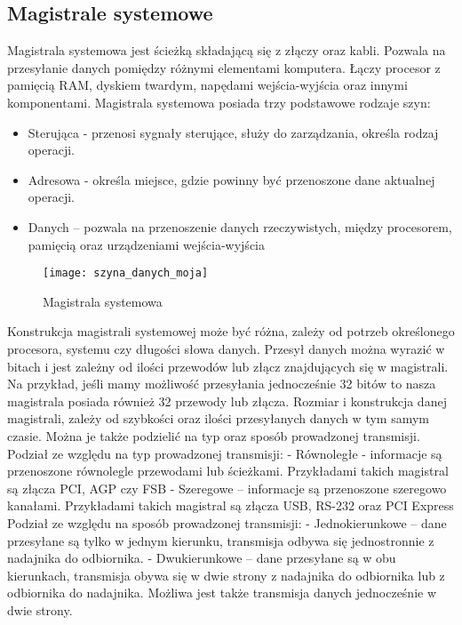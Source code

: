 \documentclass[12pt, a4paper, onside, polish]{article}				%
\begin{document}
 
\cleardoublepage

\subsection{Magistrale systemowe}
\hspace{\parindent}
Magistrala systemowa jest ścieżką składającą się z złączy oraz kabli. Pozwala na przesyłanie danych pomiędzy różnymi elementami komputera. Łączy procesor z pamięcią RAM, dyskiem twardym, napędami wejścia-wyjścia oraz innymi komponentami.  \newline\newline
Magistrala systemowa posiada trzy podstawowe rodzaje szyn:
\begin{itemize}
\item Sterująca - przenosi sygnały sterujące, służy do zarządzania, określa rodzaj operacji.
\item Adresowa - określa miejsce, gdzie powinny być przenoszone dane aktualnej operacji. 
\item Danych – pozwala na przenoszenie danych rzeczywistych, między procesorem, pamięcią oraz urządzeniami wejścia-wyjścia 
\end{itemize}
 
 
 \begin{figure}[hbt!]
{\centering \texttt{[image: szyna\_danych\_moja]} \caption{Magistrala systemowa}}\vspace{5mm}
\end{figure}


Konstrukcja magistrali systemowej może być różna, zależy od potrzeb określonego procesora, systemu czy długości słowa danych. Przesył danych można wyrazić w bitach i jest zależny od ilości przewodów lub złącz znajdujących się w magistrali. Na przykład, jeśli mamy możliwość przesyłania jednocześnie 32 bitów to nasza magistrala posiada również 32 przewody lub złącza. Rozmiar i konstrukcja danej magistrali, zależy od szybkości oraz ilości przesyłanych danych w tym samym czasie. Można je także podzielić na typ oraz sposób prowadzonej transmisji. \newline \newline
Podział ze względu na typ prowadzonej transmisji: \newline
- Równoległe - informacje są przenoszone równolegle przewodami lub ścieżkami. Przykładami takich magistral są złącza PCI, AGP czy FSB \newline
- Szeregowe – informacje są przenoszone szeregowo kanałami. Przykładami takich magistral są złącza USB, RS-232 oraz PCI Express \newline\newline
Podział ze względu na sposób prowadzonej transmisji: \newline
- Jednokierunkowe – dane przesyłane są tylko w jednym kierunku, transmisja odbywa się jednostronnie z nadajnika do odbiornika. \newline
- Dwukierunkowe – dane przesyłane są w obu kierunkach, transmisja obywa się w dwie strony z nadajnika do odbiornika lub z odbiornika do nadajnika. Możliwa jest także transmisja danych jednocześnie w dwie strony. \newline
 
\end{document}
